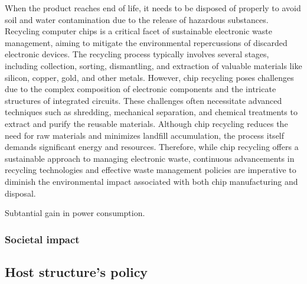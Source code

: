 When the product reaches end of life, it needs to be disposed of properly to avoid soil and water contamination due to the release of hazardous substances. Recycling computer chips is a critical facet of sustainable electronic waste management, aiming to mitigate the environmental repercussions of discarded electronic devices. The recycling process typically involves several stages, including collection, sorting, dismantling, and extraction of valuable materials like silicon, copper, gold, and other metals. However, chip recycling poses challenges due to the complex composition of electronic components and the intricate structures of integrated circuits. These challenges often necessitate advanced techniques such as shredding, mechanical separation, and chemical treatments to extract and purify the reusable materials. Although chip recycling reduces the need for raw materials and minimizes landfill accumulation, the process itself demands significant energy and resources. Therefore, while chip recycling offers a sustainable approach to managing electronic waste, continuous advancements in recycling technologies and effective waste management policies are imperative to diminish the environmental impact associated with both chip manufacturing and disposal.

Subtantial gain in power consumption.

\subsubsection{Societal impact}

\subsection{Host structure's policy}
